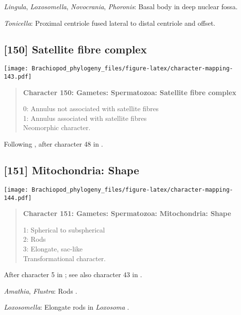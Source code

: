 \documentclass[openany]{book}
\theoremstyle{definition}
\theoremstyle{definition}
\theoremstyle{definition}
\theoremstyle{remark}
\begin{document}
\hypertarget{Lingula-coding-149}{}
\emph{Lingula}, \emph{Loxosomella}, \emph{Novocrania}, \emph{Phoronis}:
Basal body in deep nuclear fossa.

\hypertarget{Tonicella-coding-149}{}
\emph{Tonicella}: Proximal centriole fused lateral to distal centriole
and offset.

\subsection*{{[}150{]} Satellite fibre
complex}\label{satellite-fibre-complex}

\texttt{[image: Brachiopod\_phylogeny\_files/figure-latex/character-mapping-143.pdf]}

\begin{quote}
\textbf{Character 150: Gametes: Spermatozoa: Satellite fibre complex}

0: Annulus not associated with satellite fibres\\
1: Annulus associated with satellite fibres\\
Neomorphic character.
\end{quote}

Following \citet{Smith2012}, after character 48 in \citet{Ponder1997}.

\subsection*{{[}151{]} Mitochondria: Shape}\label{mitochondria-shape}

\texttt{[image: Brachiopod\_phylogeny\_files/figure-latex/character-mapping-144.pdf]}

\begin{quote}
\textbf{Character 151: Gametes: Spermatozoa: Mitochondria: Shape}

1: Spherical to subspherical\\
2: Rods\\
3: Elongate, sac-like\\
Transformational character.
\end{quote}

After character 5 in \citet{BucklandNicks2008}; see also character 43 in
\citet{Ponder1997}.

\hypertarget{Amathia-coding-151}{}
\emph{Amathia}, \emph{Flustra}: Rods \citep{Franzen1981}.

\hypertarget{Loxosomella-coding-151}{}
\emph{Loxosomella}: Elongate rods in \emph{Loxosoma}
\citep{Franzen2000}.
\end{document}
